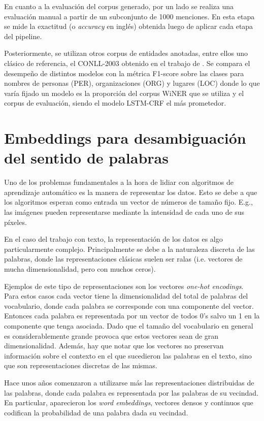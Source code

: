 En cuanto a la evaluación del corpus generado, por un lado se realiza una evaluación manual a partir de un subconjunto de 1000 menciones. En esta etapa se mide la exactitud (o \textit{accuracy} en inglés) obtenida luego de aplicar cada etapa del pipeline. 

Posteriormente, se utilizan otros corpus de entidades anotadas, entre ellos uno clásico de referencia, el CONLL-2003 obtenido en el trabajo de \cite{TjongKimSang:2003:ICS:1119176.1119195}. Se compara el desempeño de distintos modelos con la métrica F1-score sobre las clases para nombres de personas (PER), organizaciones (ORG) y lugares (LOC) donde lo que varía fijado un modelo es la proporción del corpus WiNER que se utiliza y el corpus de evaluación, siendo el modelo LSTM-CRF \cite{DBLP:journals/corr/HuangXY15} el más prometedor.

\section{Embeddings para desambiguación del sentido de palabras}

Uno de los problemas fundamentales a la hora de lidiar con algoritmos de aprendizaje automático es la manera de representar los datos. Esto se debe a que los algoritmos esperan como entrada un vector de números de tamaño fijo. E.g., las imágenes pueden representarse mediante la intensidad de cada uno de sus píxeles. 

En el caso del trabajo con texto, la representación de los datos es algo particularmente complejo. Principalmente se debe a la naturaleza discreta de las palabras, donde las representaciones clásicas suelen ser ralas (i.e. vectores de mucha dimensionalidad, pero con muchos ceros). 

Ejemplos de este tipo de representaciones son los vectores \textit{one-hot encodings}. Para estos casos cada vector tiene la dimensionalidad del total de palabras del vocabulario, donde cada palabra se corresponde con una componente del vector. Entonces cada palabra es representada por un vector de todos 0's salvo un 1 en la componente que tenga asociada. Dado que el tamaño del vocabulario en general es considerablemente grande provoca que estos vectores sean de gran dimensionalidad. Además, hay que notar que los vectores no preservan información sobre el contexto en el que sucedieron las palabras en el texto, sino que son representaciones discretas de las mismas.

Hace unos años comenzaron a utilizarse más las representaciones distribuidas de las palabras, donde cada palabra es representada por las palabras de su vecindad. En particular, aparecieron los \textit{word embeddings}, vectores densos y continuos que codifican la probabilidad de una palabra dada su vecindad. 

